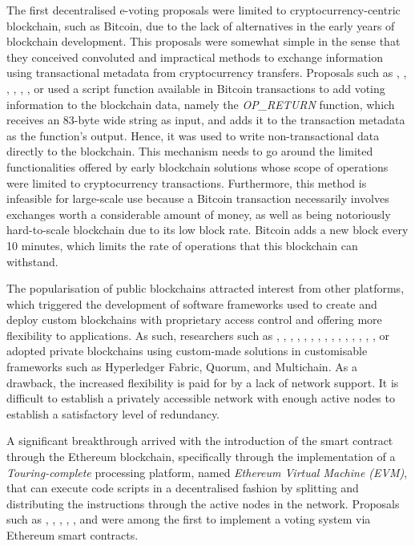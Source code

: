 \documentclass[../main.tex]{subfiles}
\begin{document}
The first decentralised e-voting proposals were limited to cryptocurrency-centric blockchain, such as Bitcoin, due to the lack of alternatives in the early years of blockchain development. This proposals were somewhat simple in the sense that they conceived convoluted and impractical methods to exchange information using transactional metadata from cryptocurrency transfers.  Proposals such as \cite{Zhao2016}, \cite{Cruz2016}, \cite{Bistarelli2017}, \cite{Lee2017}, \cite{Shaheen2017}, \cite{Wu2017}, \cite{Dimitriou2020} or \cite{Bartolucci2018} used a script function available in Bitcoin transactions to add voting information to the blockchain data, namely the \textit{OP\_RETURN} function, which receives an 83-byte wide string as input, and adds it to the transaction metadata as the function's output. Hence, it was used to write non-transactional data directly to the blockchain. This mechanism needs to go around the limited functionalities offered by early blockchain solutions whose scope of operations were limited to cryptocurrency transactions. Furthermore, this method is infeasible for large-scale use because a Bitcoin transaction necessarily involves exchanges worth a considerable amount of money, as well as being notoriously hard-to-scale blockchain due to its low block rate. Bitcoin adds a new block every 10 minutes, which limits the rate of operations that this blockchain can withstand.
\par
The popularisation of public blockchains attracted interest from other platforms, which triggered the development of software frameworks used to create and deploy custom blockchains with proprietary access control and offering more flexibility to applications. As such, researchers such as \cite{Kirby2016}, \cite{BenAyed2017}, \cite{Chaieb2018}, \cite{Burhanuddin2018}, \cite{Zhang2018}, \cite{Khan2018}, \cite{Murtaza2019}, \cite{Faour2019}, \cite{Killer2020}, \cite{Han2020}, \cite{Vivek2020}, \cite{Mani2022}, \cite{Zhou2020}, \cite{Alvi2022}, \cite{Hassan2022}, \cite{Vidwans2022} or \cite{Matile2019} adopted private blockchains using custom-made solutions in customisable frameworks such as Hyperledger Fabric, Quorum, and Multichain. As a drawback, the increased flexibility is paid for by a lack of network support. It is difficult to establish a privately accessible network with enough active nodes to establish a satisfactory level of redundancy.
\par
A significant breakthrough arrived with the introduction of the smart contract through the Ethereum blockchain, specifically through the implementation of a \textit{Touring-complete} processing platform, named \textit{Ethereum Virtual Machine (EVM)}, that can execute code scripts in a decentralised fashion by splitting and distributing the instructions through the active nodes in the network. Proposals such as \cite{McCorry2017}, \cite{Koc2018}, \cite{Dagher2018}, \cite{Fusco2018}, \cite{Hjalmarsson2018}, and \cite{Mols2020} were among the first to implement a voting system via Ethereum smart contracts.
\end{document}
